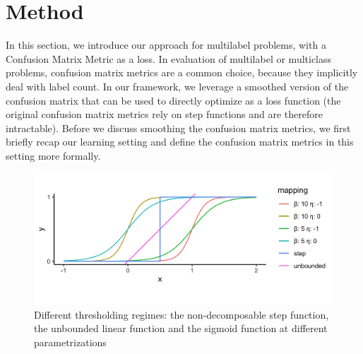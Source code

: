 
\section{Method}
\label{sec:orga8a42f5}
\label{section:method}

In this section, we introduce our approach for multilabel problems, with a Confusion Matrix Metric as a loss. In evaluation of multilabel or multiclass problems, confusion matrix metrics are a common choice, because they implicitly deal with label count. In our framework, we leverage a smoothed version of the confusion matrix that can be used to directly optimize as a loss function (the original confusion matrix metrics rely on step functions and are therefore intractable). Before we discuss smoothing the confusion matrix metrics, we first briefly recap our learning setting and define the confusion matrix metrics in this setting more formally.

\begin{figure}[tbp]
\centering
\vspace{-.5\baselineskip}
\includegraphics[width=\linewidth]{./images/sigmoid.png}
\vspace{-2\baselineskip}
\caption{\label{fig:sigmoid}
Different thresholding regimes: the non-decomposable step function, the unbounded linear function and the sigmoid function at different parametrizations}
\end{figure}
\label{fig:sigmoid}


